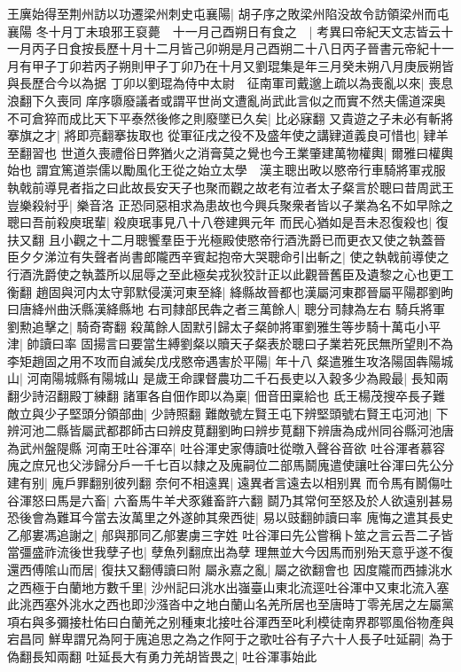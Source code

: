 王廙始得至荆州訪以功遷梁州刺史屯襄陽|{
	胡子序之敗梁州陷没故令訪領梁州而屯襄陽}
冬十月丁未琅邪王裒薨　十一月己酉朔日有食之　|{
	考異曰帝紀天文志皆云十一月丙子日食按長歷十月十二月皆己卯朔是月己酉朔二十八日丙子晉書元帝紀十一月有甲子丁卯若丙子朔則甲子丁卯乃在十月又劉琨集是年三月癸未朔八月庚辰朔皆與長歷合今以為据}
丁卯以劉琨為侍中太尉　征南軍司戴邈上疏以為喪亂以來|{
	喪息浪翻下久喪同}
庠序隳廢議者或謂平世尚文遭亂尚武此言似之而實不然夫儒道深奥不可倉猝而成比天下平泰然後修之則廢墜已久矣|{
	比必寐翻}
又貴遊之子未必有斬將搴旗之才|{
	將即亮翻搴抜取也}
從軍征戌之役不及盛年使之講肄道義良可惜也|{
	肄羊至翻習也}
世道久喪禮俗日弊猶火之消膏莫之覺也今王業肇建萬物權輿|{
	爾雅曰權輿始也}
謂宜篤道崇儒以勵風化王從之始立太學　漢主聰出畋以愍帝行車騎將軍戎服執戟前導見者指之曰此故長安天子也聚而觀之故老有泣者太子粲言於聰曰昔周武王豈樂殺紂乎|{
	樂音洛}
正恐同惡相求為患故也今興兵聚衆者皆以子業為名不如早除之聰曰吾前殺庾珉輩|{
	殺庾珉事見八十八卷建興元年}
而民心猶如是吾未忍復殺也|{
	復扶又翻}
且小觀之十二月聰饗羣臣于光極殿使愍帝行酒洗爵已而更衣又使之執蓋晉臣夕夕涕泣有失聲者尚書郎隴西辛賓起抱帝大哭聰命引出斬之|{
	使之執戟前導使之行酒洗爵使之執蓋所以屈辱之至此極矣戎狄狡計正以此觀晉舊臣及遺黎之心也更工衡翻}
趙固與河内太守郭默侵漢河東至絳|{
	絳縣故晉都也漢屬河東郡晉屬平陽郡劉昫曰唐絳州曲沃縣漢絳縣地}
右司隸部民犇之者三萬餘人|{
	聰分司隸為左右}
騎兵將軍劉勲追擊之|{
	騎奇寄翻}
殺萬餘人固默引歸太子粲帥將軍劉雅生等步騎十萬屯小平津|{
	帥讀曰率}
固揚言曰要當生縛劉粲以贖天子粲表於聰曰子業若死民無所望則不為李矩趙固之用不攻而自滅矣戊戌愍帝遇害於平陽|{
	年十八}
粲遣雅生攻洛陽固犇陽城山|{
	河南陽城縣有陽城山}
是歲王命課督農功二千石長吏以入穀多少為殿最|{
	長知兩翻少詩沼翻殿丁練翻}
諸軍各自佃作即以為稟|{
	佃音田稟給也}
氐王楊茂搜卒長子難敵立與少子堅頭分領部曲|{
	少詩照翻}
難敵號左賢王屯下辨堅頭號右賢王屯河池|{
	下辨河池二縣皆屬武都郡師古曰辨皮莧翻劉昫曰辨步莧翻下辨唐為成州同谷縣河池唐為武州盤隄縣}
河南王吐谷渾卒|{
	吐谷渾史家傳讀吐從暾入聲谷音欲}
吐谷渾者慕容廆之庶兄也父涉歸分戶一千七百以隸之及廆嗣位二部馬鬬廆遣使讓吐谷渾曰先公分建有别|{
	廆戶罪翻别彼列翻}
奈何不相遠異|{
	遠異者言遠去以相别異}
而令馬有鬭傷吐谷渾怒曰馬是六畜|{
	六畜馬牛羊犬豕雞畜許六翻}
鬬乃其常何至怒及於人欲遠别甚易恐後會為難耳今當去汝萬里之外遂帥其衆西徙|{
	易以豉翻帥讀曰率}
廆悔之遣其長史乙郍婁馮追謝之|{
	郍與那同乙郍婁虜三字姓}
吐谷渾曰先公嘗稱卜筮之言云吾二子皆當彊盛祚流後世我孽子也|{
	孽魚列翻庶出為孽}
理無並大今因馬而别殆天意乎遂不復還西傅隂山而居|{
	復扶又翻傅讀曰附}
屬永嘉之亂|{
	屬之欲翻會也}
因度隴而西據洮水之西極于白蘭地方數千里|{
	沙州記曰洮水出嵹臺山東北流逕吐谷渾中又東北流入塞此洮西塞外洮水之西也即沙漒沓中之地白蘭山名羌所居也至唐時丁零羌居之左屬黨項右與多彌接杜佑曰白蘭羌之别種東北接吐谷渾西至叱利模徒南界郡鄂風俗物產與宕昌同}
鮮卑謂兄為阿于廆追思之為之作阿于之歌吐谷有子六十人長子吐延嗣|{
	為于偽翻長知兩翻}
吐延長大有勇力羌胡皆畏之|{
	吐谷渾事始此}


